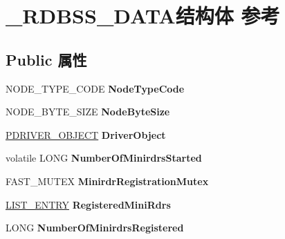 \hypertarget{struct___r_d_b_s_s___d_a_t_a}{}\section{\+\_\+\+R\+D\+B\+S\+S\+\_\+\+D\+A\+T\+A结构体 参考}
\label{struct___r_d_b_s_s___d_a_t_a}
\subsection*{Public 属性}
\begin{DoxyCompactItemize}
\item 
\mbox{\label{struct___r_d_b_s_s___d_a_t_a_a75754407f3d163e0b3c6e501ab6648ff}} 
N\+O\+D\+E\+\_\+\+T\+Y\+P\+E\+\_\+\+C\+O\+DE {\bfseries Node\+Type\+Code}
\item 
\mbox{\label{struct___r_d_b_s_s___d_a_t_a_a55cc52981b163b4a7db3c3279a6f6650}} 
N\+O\+D\+E\+\_\+\+B\+Y\+T\+E\+\_\+\+S\+I\+ZE {\bfseries Node\+Byte\+Size}
\item 
\mbox{\label{struct___r_d_b_s_s___d_a_t_a_a2a5b09fff144422a3c942072323ef767}} 
\hyperlink{struct___d_r_i_v_e_r___o_b_j_e_c_t}{P\+D\+R\+I\+V\+E\+R\+\_\+\+O\+B\+J\+E\+CT} {\bfseries Driver\+Object}
\item 
\mbox{\label{struct___r_d_b_s_s___d_a_t_a_aca2f1fe0c674323873b1f7c9a850c6b4}} 
volatile L\+O\+NG {\bfseries Number\+Of\+Minirdrs\+Started}
\item 
\mbox{\label{struct___r_d_b_s_s___d_a_t_a_aad0a44a9b50f52f8643db92b26a109b0}} 
F\+A\+S\+T\+\_\+\+M\+U\+T\+EX {\bfseries Minirdr\+Registration\+Mutex}
\item 
\mbox{\label{struct___r_d_b_s_s___d_a_t_a_afdf5ddf75459cbd90e40c443d94e6661}} 
\hyperlink{struct___l_i_s_t___e_n_t_r_y}{L\+I\+S\+T\+\_\+\+E\+N\+T\+RY} {\bfseries Registered\+Mini\+Rdrs}
\item 
\mbox{\label{struct___r_d_b_s_s___d_a_t_a_a0b8d18fa81800910162741d2b9188afc}} 
L\+O\+NG {\bfseries Number\+Of\+Minirdrs\+Registered}

\end{DoxyCompactItemize}
